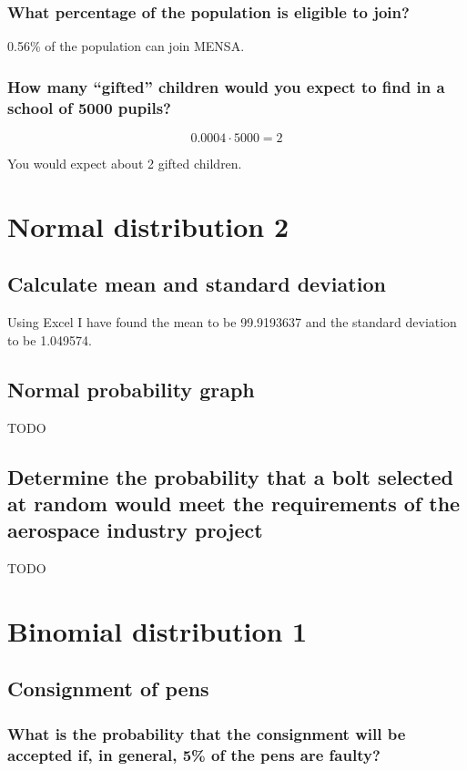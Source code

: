 \documentclass[12pt]{article}
\begin{document}
\subsubsection{What percentage of the
population is eligible to join?}

0.56\% of the population can join MENSA.

\subsubsection{How many “gifted” children would you expect to find in a school of 5000 pupils?}

\[0.0004 \cdot 5000 = 2\]

You would expect about 2 gifted children.

\section{Normal distribution 2}

\subsection{Calculate mean and standard deviation}

Using Excel I have found the mean to be 99.9193637 and the standard deviation to be 1.049574.

\subsection{Normal probability graph}

TODO

\subsection{Determine the probability that a bolt selected at random would meet the requirements of the aerospace industry project}

TODO

\section{Binomial distribution 1}

\subsection{Consignment of pens}

\subsubsection{What is the probability that the consignment will be accepted if, in general, 5\% of the pens are faulty?}
\end{document}
